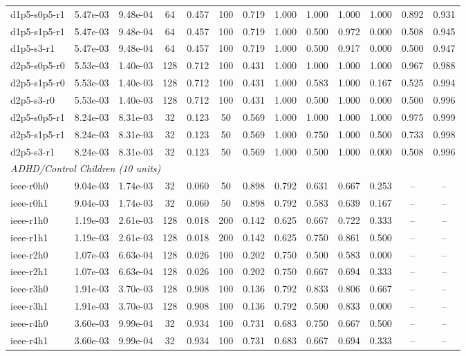 \begin{tabular}{lcccccccccccc}
d1p5-s0p5-r1 & 5.47e-03 & 9.48e-04 & 64 & 0.457 & 100 & 0.719 & 1.000 & 1.000 & 1.000 & 1.000 & 0.892 & 0.931 \\
d1p5-s1p5-r1 & 5.47e-03 & 9.48e-04 & 64 & 0.457 & 100 & 0.719 & 1.000 & 0.500 & 0.972 & 0.000 & 0.508 & 0.945 \\
d1p5-s3-r1 & 5.47e-03 & 9.48e-04 & 64 & 0.457 & 100 & 0.719 & 1.000 & 0.500 & 0.917 & 0.000 & 0.500 & 0.947 \\
d2p5-s0p5-r0 & 5.53e-03 & 1.40e-03 & 128 & 0.712 & 100 & 0.431 & 1.000 & 1.000 & 1.000 & 1.000 & 0.967 & 0.988 \\
d2p5-s1p5-r0 & 5.53e-03 & 1.40e-03 & 128 & 0.712 & 100 & 0.431 & 1.000 & 0.583 & 1.000 & 0.167 & 0.525 & 0.994 \\
d2p5-s3-r0 & 5.53e-03 & 1.40e-03 & 128 & 0.712 & 100 & 0.431 & 1.000 & 0.500 & 1.000 & 0.000 & 0.500 & 0.996 \\
d2p5-s0p5-r1 & 8.24e-03 & 8.31e-03 & 32 & 0.123 & 50 & 0.569 & 1.000 & 1.000 & 1.000 & 1.000 & 0.975 & 0.999 \\
d2p5-s1p5-r1 & 8.24e-03 & 8.31e-03 & 32 & 0.123 & 50 & 0.569 & 1.000 & 0.750 & 1.000 & 0.500 & 0.733 & 0.998 \\
d2p5-s3-r1 & 8.24e-03 & 8.31e-03 & 32 & 0.123 & 50 & 0.569 & 1.000 & 0.500 & 1.000 & 0.000 & 0.508 & 0.996 \\
\multicolumn{13}{l}{\textit{ADHD/Control Children (10 units)}} \\
ieee-r0h0 & 9.04e-03 & 1.74e-03 & 32 & 0.060 & 50 & 0.898 & 0.792 & 0.631 & 0.667 & 0.253 & -- & -- \\
ieee-r0h1 & 9.04e-03 & 1.74e-03 & 32 & 0.060 & 50 & 0.898 & 0.792 & 0.583 & 0.639 & 0.167 & -- & -- \\
ieee-r1h0 & 1.19e-03 & 2.61e-03 & 128 & 0.018 & 200 & 0.142 & 0.625 & 0.667 & 0.722 & 0.333 & -- & -- \\
ieee-r1h1 & 1.19e-03 & 2.61e-03 & 128 & 0.018 & 200 & 0.142 & 0.625 & 0.750 & 0.861 & 0.500 & -- & -- \\
ieee-r2h0 & 1.07e-03 & 6.63e-04 & 128 & 0.026 & 100 & 0.202 & 0.750 & 0.500 & 0.583 & 0.000 & -- & -- \\
ieee-r2h1 & 1.07e-03 & 6.63e-04 & 128 & 0.026 & 100 & 0.202 & 0.750 & 0.667 & 0.694 & 0.333 & -- & -- \\
ieee-r3h0 & 1.91e-03 & 3.70e-03 & 128 & 0.908 & 100 & 0.136 & 0.792 & 0.833 & 0.806 & 0.667 & -- & -- \\
ieee-r3h1 & 1.91e-03 & 3.70e-03 & 128 & 0.908 & 100 & 0.136 & 0.792 & 0.500 & 0.833 & 0.000 & -- & -- \\
ieee-r4h0 & 3.60e-03 & 9.99e-04 & 32 & 0.934 & 100 & 0.731 & 0.683 & 0.750 & 0.667 & 0.500 & -- & -- \\
ieee-r4h1 & 3.60e-03 & 9.99e-04 & 32 & 0.934 & 100 & 0.731 & 0.683 & 0.667 & 0.694 & 0.333 & -- & -- \\
\bottomrule
\end{tabular}
